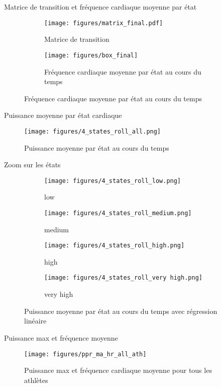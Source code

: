 \documentclass{beamer}
\begin{document}
\begin{frame}{Matrice de transition et fréquence cardiaque moyenne par état}
    \begin{figure}
        \begin{subfigure}{0.4\textwidth}
            \centering
            \texttt{[image: figures/matrix\_final.pdf]}
            \caption{Matrice de transition}
        \end{subfigure}
        \begin{subfigure}{0.55\textwidth}
            \centering
            \texttt{[image: figures/box\_final]}
            \caption{Fréquence cardiaque moyenne par état au cours du temps}
        \end{subfigure}
    \end{figure}
\end{frame}

\begin{frame}{Puissance moyenne par état cardiaque}
    \begin{figure}
        \centering
        \texttt{[image: figures/4\_states\_roll\_all.png]}
        \caption{Puissance moyenne par état au cours du temps}
    \end{figure}
\end{frame}
\begin{frame}{Zoom sur les états}
    \begin{figure}
        \centering
        \begin{subfigure}{0.45\textwidth}
            \centering
            \texttt{[image: figures/4\_states\_roll\_low.png]}
            \caption{low}
        \end{subfigure}
        \begin{subfigure}{0.45\textwidth}
            \centering
            \texttt{[image: figures/4\_states\_roll\_medium.png]}
            \caption{medium}
        \end{subfigure}
        \begin{subfigure}{0.45\textwidth}
            \centering
            \texttt{[image: figures/4\_states\_roll\_high.png]}
            \caption{high}
        \end{subfigure}
        \begin{subfigure}{0.45\textwidth}
            \centering
            \texttt{[image: figures/4\_states\_roll\_very high.png]}
            \caption{very high}
        \end{subfigure}
        \caption*{Puissance moyenne par état au cours du temps avec régression linéaire}
    \end{figure}
\end{frame}
\begin{frame}{Puissance max et fréquence moyenne}
    \begin{figure}
        \centering
        \texttt{[image: figures/ppr\_ma\_hr\_all\_ath]}
        \caption{Puissance max et fréquence cardiaque moyenne pour tous les athlètes}
    \end{figure}
\end{frame}
\end{document}
